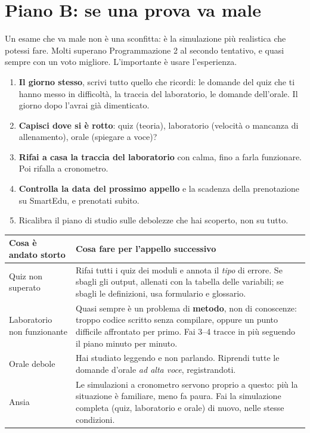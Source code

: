 \section{Piano B: se una prova va male}

Un esame che va male non è una sconfitta: è la simulazione più realistica che potessi
fare. Molti superano Programmazione 2 al secondo tentativo, e quasi sempre con un voto
migliore. L'importante è usare l'esperienza.

\begin{passopasso}
\begin{enumerate}
  \item \textbf{Il giorno stesso}, scrivi tutto quello che ricordi: le domande del quiz
        che ti hanno messo in difficoltà, la traccia del laboratorio, le domande
        dell'orale. Il giorno dopo l'avrai già dimenticato.
  \item \textbf{Capisci dove si è rotto}: quiz (teoria), laboratorio (velocità o
        mancanza di allenamento), orale (spiegare a voce)?
  \item \textbf{Rifai a casa la traccia del laboratorio} con calma, fino a farla
        funzionare. Poi rifalla a cronometro.
  \item \textbf{Controlla la data del prossimo appello} e la scadenza della prenotazione
        su SmartEdu, e prenotati subito.
  \item Ricalibra il piano di studio sulle debolezze che hai scoperto, non su tutto.
\end{enumerate}
\end{passopasso}

\begin{center}\small
\begin{tabular}{p{3.4cm}p{9.8cm}}
\toprule
\textbf{Cosa è andato storto} & \textbf{Cosa fare per l'appello successivo} \\
\midrule
Quiz non superato & Rifai tutti i quiz dei moduli e annota il \emph{tipo} di errore. Se
sbagli gli output, allenati con la tabella delle variabili; se sbagli le definizioni,
usa formulario e glossario. \\
Laboratorio non funzionante & Quasi sempre è un problema di \textbf{metodo}, non di
conoscenze: troppo codice scritto senza compilare, oppure un punto difficile affrontato
per primo. Fai 3--4 tracce in più seguendo il piano minuto per minuto. \\
Orale debole & Hai studiato leggendo e non parlando. Riprendi tutte le domande d'orale
\emph{ad alta voce}, registrandoti. \\
Ansia & Le simulazioni a cronometro servono proprio a questo: più la situazione è
familiare, meno fa paura. Fai la simulazione completa (quiz, laboratorio e orale) di
nuovo, nelle stesse condizioni. \\
\bottomrule
\end{tabular}
\end{center}

